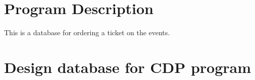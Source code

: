 \documentclass[10pt]{article}
\begin{document}
    \maketitle
    \newpage

    \section{Program Description}\label{sec:program-description}
    This is a database for ordering a ticket on the events.

    \section{Design database for CDP program}\label{sec:database-design}
    
\end{document}

